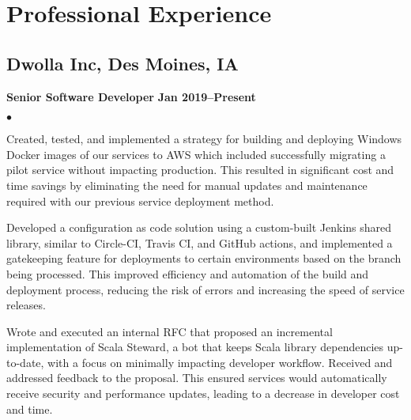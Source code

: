 \documentclass[10pt,letterpaper]{article}
\renewenvironment{itemize}{
  \begin{list}{}{
      \setlength{\leftmargin}{1.5em}
      \setlength{\itemsep}{0.25em}
      \setlength{\parskip}{0pt}
      \setlength{\parsep}{0.25em}
    }
  }{
  \end{list}
}
\newenvironment{bitemize}{
  \begin{list}{\(\bullet \)}{
      \setlength{\leftmargin}{1.5em}
      \setlength{\itemsep}{0.25em}
      \setlength{\parskip}{0pt}
      \setlength{\parsep}{0.25em}
    }
  }{
  \end{list}
}
\newcommand{\yearrange}[1]{\hfill \textbf{#1} \par}
\begin{document}
\section*{Professional Experience}

\subsection*{Dwolla Inc, Des Moines, IA}

\begin{itemize}
  \item \textbf{Senior Software Developer} \yearrange{Jan 2019--Present}
        \begin{bitemize}
          \item Created, tested, and implemented a strategy for building and deploying
          Windows Docker images of our services to AWS which included successfully
          migrating a pilot service without impacting production. This resulted in
          significant cost and time savings by eliminating the need for manual
          updates and maintenance required with our previous service deployment
          method.
          \item Developed a configuration as code solution using a custom-built
          Jenkins shared library, similar to Circle-CI, Travis CI, and GitHub
          actions, and implemented a gatekeeping feature for deployments to certain
          environments based on the branch being processed. This improved efficiency
          and automation of the build and deployment process, reducing the risk of
          errors and increasing the speed of service releases.
          \item Wrote and executed an internal RFC that proposed an incremental
          implementation of Scala Steward, a bot that keeps Scala library
          dependencies up-to-date, with a focus on minimally impacting developer
          workflow. Received and addressed feedback to the proposal. This ensured
          services would automatically receive security and performance updates,
          leading to a decrease in developer cost and time.
        \end{bitemize}
\end{itemize}
\end{document}
